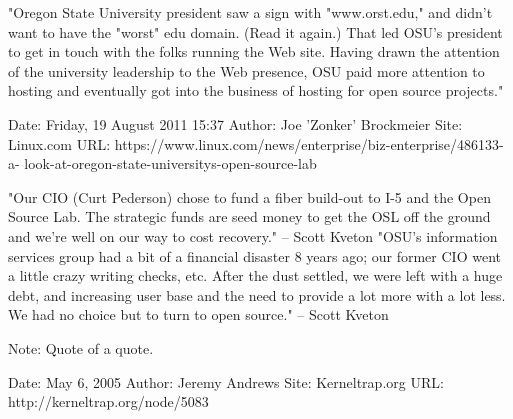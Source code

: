"Oregon State University president saw a sign with "www.orst.edu," and didn't
want to have the "worst" edu domain. (Read it again.) That led OSU's president
to get in touch with the folks running the Web site. Having drawn the attention
of the university leadership to the Web presence, OSU paid more attention to
hosting and eventually got into the business of hosting for open source
projects."

Date: Friday, 19 August 2011 15:37  
Author: Joe 'Zonker' Brockmeier
Site: Linux.com
URL:
https://www.linux.com/news/enterprise/biz-enterprise/486133-a-
    look-at-oregon-state-universitys-open-source-lab


"Our CIO (Curt Pederson) chose to fund a fiber build-out to I-5 and the Open Source Lab. The strategic funds are seed money to get the OSL off the ground and we're well on our way to cost recovery." -- Scott Kveton
"OSU's information services group had a bit of a financial disaster 8 years ago; our former CIO went a little crazy writing checks, etc. After the dust settled, we were left with a huge debt, and increasing user base and the need to provide a lot more with a lot less. We had no choice but to turn to open source." -- Scott Kveton

Note: Quote of a quote.

Date: May 6, 2005
Author: Jeremy Andrews
Site: Kerneltrap.org
URL: http://kerneltrap.org/node/5083
